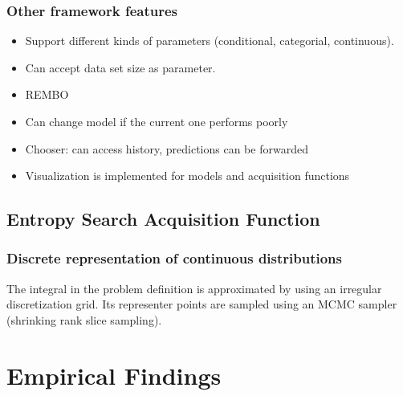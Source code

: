 \documentclass[10pt,handout]{beamer}
\begin{document}
\begin{frame}
\frametitle{Other framework features}

\begin{itemize}
\item Support different kinds of parameters (conditional, categorial, 
continuous).
\item Can accept data set size as parameter.
\item REMBO
\item Can change model if the current one performs poorly
\item Chooser: can access history, predictions can be forwarded
\item Visualization is implemented for models and acquisition functions

\end{itemize}

\end{frame}


\subsection{Entropy Search Acquisition Function}

\begin{frame}
\frametitle{Discrete representation of continuous distributions}

The integral in the problem definition is approximated by using an irregular
discretization grid. Its representer points are sampled using an MCMC sampler
(shrinking rank slice sampling).

\end{frame}








\section{Empirical Findings}

\end{document}
